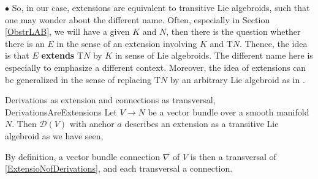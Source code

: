 \begin{remark}
$\bullet$ So, in our case, extensions are equivalent to transitive Lie algebroids, such that one may wonder about the different name. Often, especially in Section \ref{ObstrLAB}, we will have a given $K$ and $N$, then there is the question whether there is an $E$ in the sense of an extension involving $K$ and $\mathrm{T}N$. Thence, the idea is that $E$ \textbf{extends} $\mathrm{T}N$ by $K$ in sense of Lie algebroids. The different name here is especially to emphasize a different context. Moreover, the idea of extensions can be generalized in the sense of replacing $\mathrm{T}N$ by an arbitrary Lie algebroid as in \cite[Definition 3.3.19; page 109]{mackenzieGeneralTheory}.
\end{remark}

\begin{examples}{Derivations as extension and connections as transversal, \newline \cite[second statement of Corollary 3.6.11; page 140]{mackenzieGeneralTheory}}{DerivationsAreExtensions}
Let $V \to N$ be a vector bundle over a smooth manifold $N$. Then $\mathcal{D}(V)$ with anchor $a$ describes an extension as a transitive Lie algebroid as we have seen,
\be\label{ExtensioNofDerivations}
\ee
By definition, a vector bundle connection $\nabla$ of $V$ is then a transversal of \eqref{ExtensioNofDerivations}, and each transversal a connection.


\end{examples}
